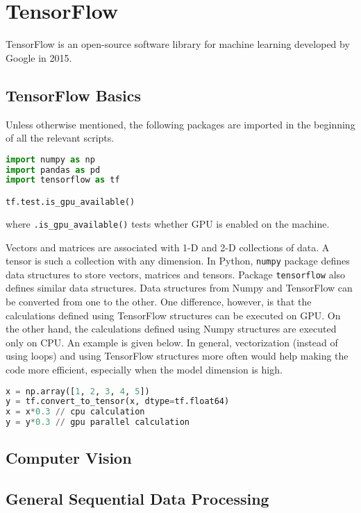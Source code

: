 \section{TensorFlow}

TensorFlow is an open-source software library for machine learning developed by Google in 2015.

\subsection{TensorFlow Basics}

Unless otherwise mentioned, the following packages are imported in the beginning of all the relevant scripts.
\begin{lstlisting}[language=Python]
import numpy as np
import pandas as pd
import tensorflow as tf

tf.test.is_gpu_available()
\end{lstlisting}
where \verb|.is_gpu_available()| tests whether GPU is enabled on the machine.

Vectors and matrices are associated with 1-D and 2-D collections of data. A tensor is such a collection with any dimension. In Python, \verb|numpy| package defines data structures to store vectors, matrices and tensors. Package \verb|tensorflow| also defines similar data structures. Data structures from Numpy and TensorFlow can be converted from one to the other. One difference, however, is that the calculations defined using TensorFlow structures can be executed on GPU. On the other hand, the calculations defined using Numpy structures are executed only on CPU. An example is given below. In general, vectorization (instead of using loops) and using TensorFlow structures more often would help making the code more efficient, especially when the model dimension is high.
\begin{lstlisting}[language=Python]
x = np.array([1, 2, 3, 4, 5])
y = tf.convert_to_tensor(x, dtype=tf.float64)
x = x*0.3 // cpu calculation
y = y*0.3 // gpu parallel calculation
\end{lstlisting}




\subsection{Computer Vision}



\subsection{General Sequential Data Processing}


